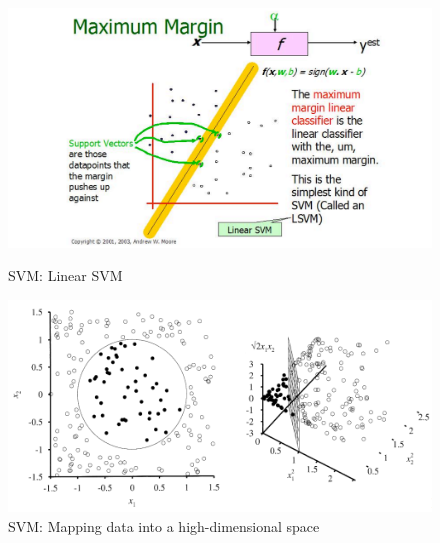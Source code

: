 \documentclass[a4paper]{article}
\begin{document}
\begin{figure}[H]
    \centering
    \begin{minipage}{0.48\textwidth}
      \centering
      \includegraphics[width=\linewidth]{./images/SVM_Linear SVM.png}
      \caption{SVM: Linear SVM}
      \label{fig.SVM_Linear SVM[Illustration of Linear SVM. (Taken from Andrew W. Moore slides 2003)]}
    \end{minipage}\hfill
    \begin{minipage}{0.48\textwidth}
      \centering
      \includegraphics[width=\linewidth]{./images/SVM_High-dimensional_Space.png}
      \caption{SVM: Mapping data into a high-dimensional space\cite{ref_svm2}}
      \label{fig.SVM_High-dimensional_Space}
    \end{minipage}
\end{figure}
\end{document}
